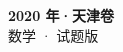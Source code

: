 \documentclass[zihao=-4, a4paper]{ctexart}
\begin{document}
\begin{center}
  {\Large\bfseries 2020 年·天津卷}\\[4pt]
  {\large 数学 · 试题版}
\end{center}
\medskip
{}

\end{document}
